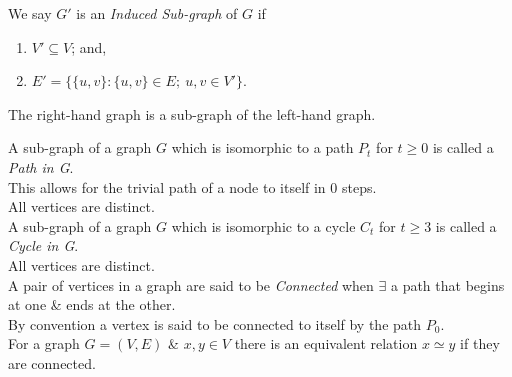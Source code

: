 \documentclass[11pt,a4paper]{article}
\begin{document}
We say $G'$ is an \textit{Induced Sub-graph} of $G$ if
\begin{enumerate}[label=\roman*)]
	\item $V'\subseteq V$; and,
	\item $E'=\{\{u,v\}:\{u,v\}\in E;\ u,v\in V'\}$.
\end{enumerate}

The right-hand graph is a sub-graph of the left-hand graph.\\

A sub-graph of a graph $G$ which is isomorphic to a path $P_t$ for $t\geq 0$ is called a \textit{Path in G}.\\
\nb This allows for the trivial path of a node to itself in 0 steps.\\
\nb All vertices are distinct.\\

A sub-graph of a graph $G$ which is isomorphic to a cycle $C_t$ for $t\geq 3$ is called a \textit{Cycle in G}.\\
\nb All vertices are distinct.\\

A pair of vertices in a graph are said to be \textit{Connected} when $\exists$ a path that begins at one \& ends at the other.\\
\nb By convention a vertex is said to be connected to itself by the path $P_0$.\\

For a graph $G=(V,E)$ \& $x,y\in V$ there is an equivalent relation $x\simeq y$ if they are connected.\\
\end{document}
